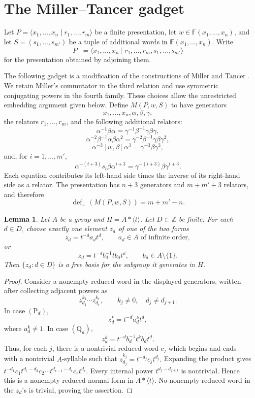 \documentclass[a4paper,11pt,reqno]{amsart}
\newtheorem{lemma}[theorem]{Lemma}
\theoremstyle{definition}
\theoremstyle{remark}
\newcommand{\Free}{\mathbb F}
\newcommand{\defp}{\operatorname{def}_{+}}
\begin{document}
	\section{The Miller--Tancer gadget}
	\label{sec:miller-tancer-gadgetry}
	
	Let
	\(
	P=\langle x_1,\dots,x_n\mid r_1,\dots,r_m\rangle
	\)
	be a finite presentation, let $w\in\Free(x_1,\dots,x_n)$, and let
	$S=(s_1,\dots,s_{m'})$ be a tuple of additional words in
	$\Free(x_1,\dots,x_n)$. Write
	\[
	P^+=\langle x_1,\dots,x_n\mid
	r_1,\dots,r_m,s_1,\dots,s_{m'}\rangle
	\]
	for the presentation obtained by adjoining them.
	
	The following gadget is a modification of the constructions of Miller and
	Tancer \cite{Miller1992,Tancer}. We retain Miller's commutator in the third
	relation and use symmetric conjugating powers in the fourth family. 
	These choices allow the unrestricted embedding argument given below.
	Define $M(P,w,S)$ to have generators
	\[
	x_1,\dots,x_n,\alpha,\beta,\gamma,
	\]
	the relators $r_1,\dots,r_m$, and the following additional relators:
	\[
	\alpha^{-1}\beta\alpha
	=
	\gamma^{-1}\beta^{-1}\gamma\beta\gamma, \tag{MT1}
	\]
	\[
	\alpha^{-2}\beta^{-1}\alpha\beta\alpha^{2}
	=
	\gamma^{-2}\beta^{-1}\gamma\beta\gamma^{2}, \tag{MT2}
	\]
	\[
	\alpha^{-3}[w,\beta]\alpha^{3}
	=
	\gamma^{-3}\beta\gamma^{3}, \tag{MT3}
	\]
	and, for $i=1,\dots,m'$,
	\[
	\alpha^{-(i+3)}s_i\beta\alpha^{i+3}
	=
	\gamma^{-(i+3)}\beta\gamma^{i+3}. \tag{MT4}
	\]
	Each equation contributes its left-hand side times the inverse of its
	right-hand side as a relator. The presentation has $n+3$ generators and
	$m+m'+3$ relators, and therefore
	\[
	\defp(M(P,w,S))=m+m'-n.
	\]
	
	\begin{lemma}
		\label{lem:branch-normal-form}
		Let $A$ be a group and $H=A*\langle t\rangle$. Let
		$D\subset\mathbb Z$ be finite. For each $d\in D$, choose exactly one
		element $z_d$ of one of the two forms
		\[
		z_d=t^{-d}a_dt^d,
		\qquad a_d\in A\text{ of infinite order}, \tag{P$_d$}
		\]
		or
		\[
		z_d=t^{-d}b_d^{-1}tb_dt^d,
		\qquad b_d\in A\setminus\{1\}. \tag{Q$_d$}
		\]
		Then $\{z_d:d\in D\}$ is a free basis for the subgroup it generates in $H$.
	\end{lemma}
	
	\begin{proof}
		Consider a nonempty reduced word in the displayed generators, written after
		collecting adjacent powers as
		\[
		z_{d_1}^{k_1}\cdots z_{d_r}^{k_r},
		\qquad
		k_j\ne0,\quad d_j\ne d_{j+1}.
		\]
		In case $(\mathrm P_d)$,
		\[
		z_d^k=t^{-d}a_d^kt^d,
		\]
		where $a_d^k\ne1$. In case $(\mathrm Q_d)$,
		\[
		z_d^k=t^{-d}b_d^{-1}t^kb_dt^d.
		\]
		Thus, for each $j$, there is a nontrivial reduced word $c_j$ which
		begins and ends with a nontrivial $A$-syllable such that
		\(
		z_{d_j}^{k_j}=t^{-d_j}c_jt^{d_j}.
		\)
		Expanding the product gives
		\(
		t^{-d_1}c_1t^{d_1-d_2}c_2
		\cdots
		t^{d_{r-1}-d_r}c_rt^{d_r}.
		\)
		Every internal power $t^{d_j-d_{j+1}}$ is nontrivial. Hence this is a
		nonempty reduced normal form in $A*\langle t\rangle$. No nonempty reduced
		word in the $z_d$'s is trivial, proving the assertion.
	\end{proof}
	
\end{document}
